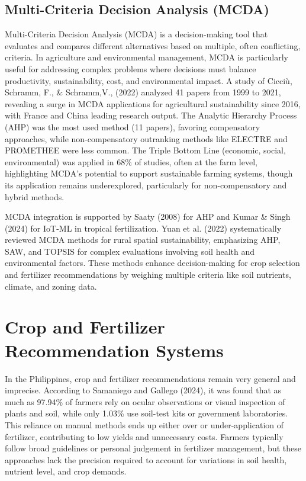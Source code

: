 {\subsection{Multi-Criteria Decision Analysis (MCDA)}

Multi-Criteria Decision Analysis (MCDA) is a decision-making tool that evaluates and compares different alternatives based on multiple, often conflicting, criteria. In agriculture and environmental management, MCDA is particularly useful for addressing complex problems where decisions must balance productivity, sustainability, cost, and environmental impact. A study of Cicciù, Schramm, F., \& Schramm,V., (2022) analyzed 41 papers from 1999 to 2021, revealing a surge in MCDA applications for agricultural sustainability since 2016, with France and China leading research output. The Analytic Hierarchy Process (AHP) was the most used method (11 papers), favoring compensatory approaches, while non-compensatory outranking methods like ELECTRE and PROMETHEE were less common. The Triple Bottom Line (economic, social, environmental) was applied in 68\% of studies, often at the farm level, highlighting MCDA’s potential to support sustainable farming systems, though its application remains underexplored, particularly for non-compensatory and hybrid methods.

MCDA integration is supported by Saaty (2008) for AHP and Kumar \& Singh (2024) for IoT-ML in tropical fertilization. Yuan et al. (2022) systematically reviewed MCDA methods for rural spatial sustainability, emphasizing AHP, SAW, and TOPSIS for complex evaluations involving soil health and environmental factors. These methods enhance decision-making for crop selection and fertilizer recommendations by weighing multiple criteria like soil nutrients, climate, and zoning data.

\section{Crop and Fertilizer Recommendation Systems}
In the Philippines, crop and fertilizer recommendations remain very general and imprecise. According to Samaniego and Gallego (2024), it was found that as much as 97.94\% of farmers rely on ocular observations or visual inspection of plants and soil, while only 1.03\% use soil-test kits or government laboratories. This reliance on manual methods ends up either over or under-application of fertilizer, contributing to low yields and unnecessary costs. Farmers typically follow broad guidelines or personal judgement in fertilizer management, but these approaches lack the precision required to account for variations in soil health, nutrient level, and crop demands.

}
